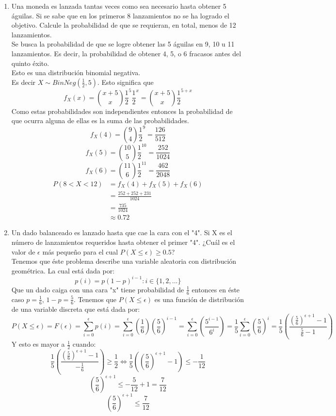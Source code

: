 \documentclass[11pt,a4paper]{report}
\begin{document}
\begin{enumerate}
		\item{
			Una moneda es lanzada tantas veces como sea necesario hasta obtener
            5 águilas. Si se sabe que en los primeros 8 lanzamientos no se ha
            logrado el objetivo. Calcule la probabilidad de que se requieran, en
            total, menos de 12 lanzamientos.\\
			Se busca la probabilidad de que se logre obtener las 5 águilas en 9,
			10 u 11 lanzamientos. Es decir, la probabilidad de obtener 4, 5, o
			6 fracasos antes del quinto éxito. \\
			Esto es una distribución binomial negativa.\\
			Es decir $X \sim BinNeg(\frac{1}{2}, 5)$. Esto significa que
			\[f_X(x) = {x+5 \choose x} \frac{1}{2}^5 \frac{1}{2}^x =
			{x+5 \choose x} \frac{1}{2}^{5+x}\]
			Como estas probabilidades son independientes entonces la probabilidad
			de que ocurra alguna de ellas es la suma de las probabilidades.
			\[f_X(4) = {9 \choose 4} \frac{1}{2}^{9} = \frac{126}{512}\]
			\[f_X(5) = {10 \choose 5} \frac{1}{2}^{10} = \frac{252}{1024}\]
			\[f_X(6) = {11 \choose 6} \frac{1}{2}^{11} = \frac{462}{2048}\]
			\begin{align*}
				P(8 < X < 12) &= f_X(4) + f_X(5) + f_X(6) \\
							  &= \frac{252+252+231}{1024} \\
							  &= \frac{735}{1024} \\
							  &\approx 0.72
			\end{align*}
		}

		\item{
			Un dado balanceado es lanzado hasta que cae la cara con el "4". Si X
            es el número de lanzamientos requeridos hasta obtener el primer "4".
            ¿Cuál es el valor de $\epsilon$ más pequeño para el cual
            $P(X \leq \epsilon) \geq 0.5$?\\
            Tenemos que éste problema describe una variable aleatoria con distribución geométrica. La cual está dada por:
            $$p(i)=p(1-p)^{i-1}: i\in \lbrace 1,2,... \rbrace $$
            Que un dado caiga con una cara "x" tiene probabilidad de $\frac{1}{6}$ entonces en éste caso $p=\frac{1}{6}$, $1-p=\frac{5}{6}$. Tenemos que $P(X\leq \epsilon) $ es una función de distribución de una variable discreta que está dada por:
            $$P(X\leq \epsilon)=F(\epsilon)=\sum_{i=0}^{\epsilon}p(i)=\sum_{i=0}^{\epsilon}(\frac{1}{6})(\frac{5}{6})^{i-1}=\sum_{i=0}^{\epsilon}(\frac{5^{i-1}}{6^{i}})=\frac{1}{5}\sum_{i=0}^{\epsilon}(\frac{5}{6})^{i}=\frac{1}{5}(\frac{(\frac{5}{6})^{\epsilon+1}-1}{\frac{5}{6}-1})$$ Y esto es mayor a $\frac{1}{2}$ cuando:
            $$\frac{1}{5}(\frac{(\frac{5}{6})^{\epsilon+1}-1}{-\frac{1}{6}})\geq \frac{1}{2}\Leftrightarrow \frac{1}{5}((\frac{5}{6})^{\epsilon+1}-1)\leq -\frac{1}{12}$$
            $$(\frac{5}{6})^{\epsilon+1}\leq -\frac{5}{12}+1=\frac{7}{12}$$
            $$(\frac{5}{6})^{\epsilon+1}\leq \frac{7}{12}$$
            
}
\end{enumerate}
\end{document}
